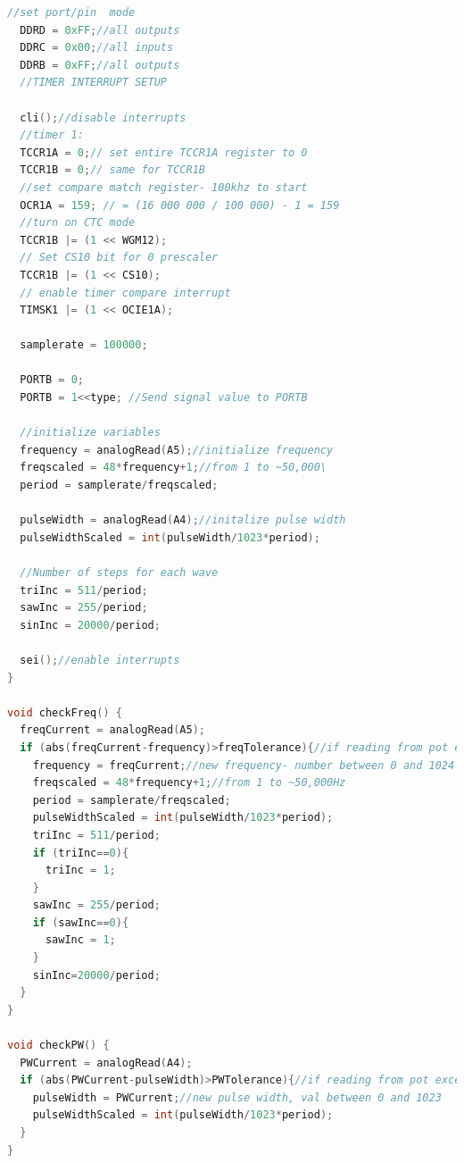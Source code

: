 \documentclass[11pt]{article}
\begin{document}
\begin{lstlisting}[language=C, caption=Código implementado para el generador de funciones, label = alg:code]
  //set port/pin  mode
  DDRD = 0xFF;//all outputs
  DDRC = 0x00;//all inputs
  DDRB = 0xFF;//all outputs
  //TIMER INTERRUPT SETUP
  
  cli();//disable interrupts
  //timer 1:
  TCCR1A = 0;// set entire TCCR1A register to 0
  TCCR1B = 0;// same for TCCR1B
  //set compare match register- 100khz to start
  OCR1A = 159; // = (16 000 000 / 100 000) - 1 = 159
  //turn on CTC mode
  TCCR1B |= (1 << WGM12);
  // Set CS10 bit for 0 prescaler
  TCCR1B |= (1 << CS10);
  // enable timer compare interrupt
  TIMSK1 |= (1 << OCIE1A); 
  
  samplerate = 100000;
  
  PORTB = 0;
  PORTB = 1<<type; //Send signal value to PORTB
  
  //initialize variables
  frequency = analogRead(A5);//initialize frequency
  freqscaled = 48*frequency+1;//from 1 to ~50,000\
  period = samplerate/freqscaled;
   
  pulseWidth = analogRead(A4);//initalize pulse width
  pulseWidthScaled = int(pulseWidth/1023*period);

  //Number of steps for each wave
  triInc = 511/period;
  sawInc = 255/period;
  sinInc = 20000/period;
  
  sei();//enable interrupts
}

void checkFreq() {
  freqCurrent = analogRead(A5);
  if (abs(freqCurrent-frequency)>freqTolerance){//if reading from pot exceeds tolerance
    frequency = freqCurrent;//new frequency- number between 0 and 1024
    freqscaled = 48*frequency+1;//from 1 to ~50,000Hz
    period = samplerate/freqscaled;
    pulseWidthScaled = int(pulseWidth/1023*period);
    triInc = 511/period;
    if (triInc==0){
      triInc = 1;
    }
    sawInc = 255/period;
    if (sawInc==0){
      sawInc = 1;
    }
    sinInc=20000/period;
  }
}

void checkPW() {
  PWCurrent = analogRead(A4);
  if (abs(PWCurrent-pulseWidth)>PWTolerance){//if reading from pot exceeds tolerance
    pulseWidth = PWCurrent;//new pulse width, val between 0 and 1023
    pulseWidthScaled = int(pulseWidth/1023*period);
  }
}



\end{lstlisting}
\end{document}
